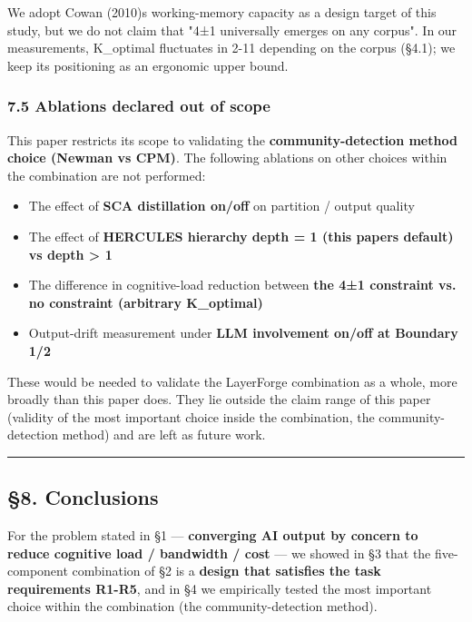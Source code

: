 \documentclass[
]{article}
\providecommand{\tightlist}{%
  \setlength{\itemsep}{0pt}\setlength{\parskip}{0pt}}
\begin{document}
We adopt Cowan (2010)\textquotesingle s working-memory capacity as a
design target of this study, but we do not claim that "4±1 universally
emerges on any corpus". In our measurements, K\_optimal fluctuates in
2-11 depending on the corpus (§4.1); we keep its positioning as an
ergonomic upper bound.

\subsubsection{7.5 Ablations declared out of
scope}\label{75-ablations-declared-out-of-scope}

This paper restricts its scope to validating the
\textbf{community-detection method choice (Newman vs CPM)}. The
following ablations on other choices within the combination are not
performed:

\begin{itemize}
\tightlist
\item
  The effect of \textbf{SCA distillation on/off} on partition / output
  quality
\item
  The effect of \textbf{HERCULES hierarchy depth = 1 (this
  paper\textquotesingle s default) vs depth \textgreater{} 1}
\item
  The difference in cognitive-load reduction between \textbf{the 4±1
  constraint vs. no constraint (arbitrary K\_optimal)}
\item
  Output-drift measurement under \textbf{LLM involvement on/off at
  Boundary 1/2}
\end{itemize}

These would be needed to validate the LayerForge combination as a whole,
more broadly than this paper does. They lie outside the claim range of
this paper (validity of the most important choice inside the
combination, the community-detection method) and are left as future
work.

\begin{center}\rule{0.5\linewidth}{0.5pt}\end{center}

\subsection{§8. Conclusions}\label{8-conclusions}

For the problem stated in §1 --- \textbf{converging AI output by concern
to reduce cognitive load / bandwidth / cost} --- we showed in §3 that
the five-component combination of §2 is a \textbf{design that satisfies
the task requirements R1-R5}, and in §4 we empirically tested the most
important choice within the combination (the community-detection
method).
\end{document}

